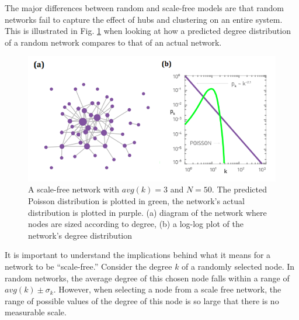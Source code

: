 \documentclass{article}
\begin{document}
The major differences between random and scale-free models are that random networks fail to capture the effect of hubs and clustering on an entire system.  This is illustrated in Fig. \ref{fig:power} when looking at how a predicted degree distribution of a random network compares to that of an actual network.

\begin{figure}[h]
    \center
    \label{fig:power}
    \includegraphics[scale=0.7]{ns-poisson2powerfinal}
    \caption{A scale-free network with $avg(k) = 3$ and $N=50$. The predicted Poisson distribution is plotted in green, the network's actual distribution is plotted in purple. (a) diagram of the network where nodes are sized according to degree, (b) a log-log plot of the network's degree distribution \cite{ns}}
\end{figure}

It is important to understand the implications behind what it means for a network to be ``scale-free.''  Consider the degree $k$ of a randomly selected node.  In random networks, the average degree of this chosen node falls within a range of $avg(k) \pm \sigma _k$.  However, when selecting a node from a scale free network, the range of possible values of the degree of this node is so large that there is no measurable scale.
\end{document}

